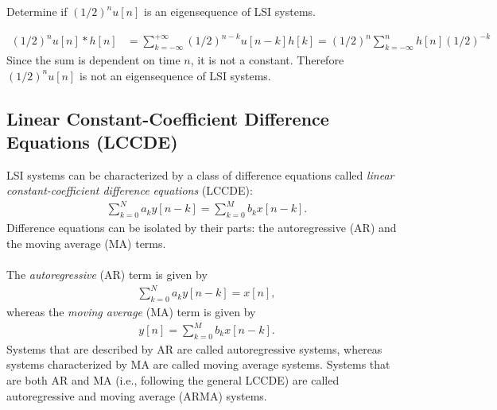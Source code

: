 \documentclass{report}
\begin{document}
\begin{example}
    Determine if $(1/2)^n u[n]$ is an eigensequence of LSI systems.
\end{example}
\begin{solution}
    \begin{align*}
        (1/2)^n u[n] * h[n] &= \sum_{k=-\infty}^{+\infty} (1/2)^{n-k}u[n-k]h[k] = (1/2)^n \sum_{k=-\infty}^{n} h[n](1/2)^{-k}
    \end{align*}
    Since the sum is dependent on time $n$, it is not a constant. Therefore $(1/2)^n u[n]$ is not an eigensequence of LSI systems.
\end{solution}

\subsection{Linear Constant-Coefficient Difference Equations (LCCDE)}
LSI systems can be characterized by a class of difference equations called 
\emph{linear constant-coefficient difference equations} (LCCDE):
\begin{align}
    \sum_{k=0}^{N} a_k y[n-k] = \sum_{k=0}^{M} b_k x[n-k].
\end{align}
Difference equations can be isolated by their parts: the autoregressive (AR) and the moving average (MA) terms. 
\\ \\
The \emph{autoregressive} (AR) term is given by 
\begin{align}
    \sum_{k=0}^{N} a_k y[n-k] = x[n],
\end{align}
whereas the \emph{moving average} (MA) term is given by
\begin{align}
    y[n] = \sum_{k=0}^{M} b_k x[n-k].
\end{align}
Systems that are described by AR are called autoregressive systems, whereas systems characterized by MA are called moving average systems. Systems that 
are both AR and MA (i.e., following the general LCCDE) are called autoregressive and moving average (ARMA) systems.
\end{document}
